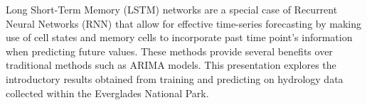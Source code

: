 \begin{doublespace}
Long Short-Term Memory (LSTM) networks are a special case of Recurrent Neural Networks (RNN) that allow for effective time-series forecasting by making use of cell states and memory cells to incorporate past time point's information when predicting future values. These methods provide several benefits over traditional methods such as ARIMA models. This presentation explores the introductory results obtained from training and predicting on hydrology data collected within the Everglades National Park.
\end{doublespace}
